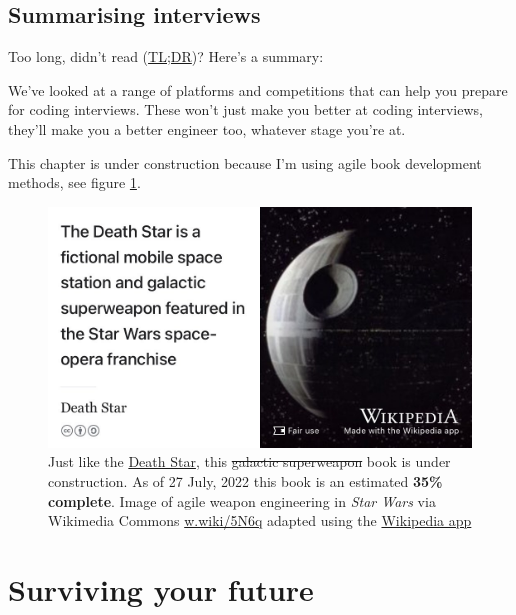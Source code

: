 \documentclass[
]{book}
\begin{document}
\hypertarget{tldr9}{%
\section{Summarising interviews}\label{tldr9}}

Too long, didn't read (\href{https://en.wiktionary.org/wiki/too_long;_didn\%27t_read}{TL;DR})? Here's a summary:

We've looked at a range of platforms and competitions that can help you prepare for coding interviews. These won't just make you better at coding interviews, they'll make you a better engineer too, whatever stage you're at.

This chapter is under construction because I'm using agile book development methods, see figure \ref{fig:deathstar6-fig}.

\begin{figure}

{\centering \includegraphics[width=0.99\linewidth]{images/DeathStar2} 

}

\caption{Just like the \href{https://en.wikipedia.org/wiki/Death_Star}{Death Star}, this \sout{galactic superweapon} book is under construction. As of 27 July, 2022 this book is an estimated \textbf{35\% complete}. Image of agile weapon engineering in \emph{Star Wars} via Wikimedia Commons \href{https://w.wiki/5N6q}{w.wiki/5N6q} adapted using the \href{https://apps.apple.com/gb/app/wikipedia/id324715238}{Wikipedia app}}\label{fig:deathstar6-fig}
\end{figure}

\hypertarget{surviving}{%
\chapter{Surviving your future}\label{surviving}}
\end{document}
